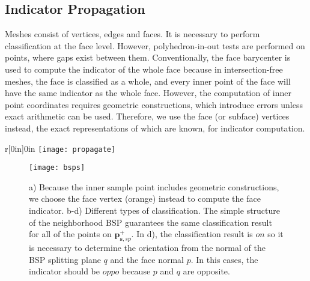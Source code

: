 \subsection{Indicator Propagation}
\label{sec:propagation}



Meshes consist of vertices, edges and faces. It is necessary to perform classification at the face level. However, polyhedron-in-out tests are performed on points, where gaps exist between them. Conventionally, the face barycenter is used to compute the indicator of the whole face because in intersection-free meshes, the face is classified as a whole, and every inner point of the face will have the same indicator as the whole face. However, the computation of inner point coordinates requires geometric constructions, which introduce errors unless exact arithmetic can be used. Therefore, we use the face (or subface) vertices instead, the exact representations of which are known, for indicator computation.

\begin{wrapfigure}{r}[0in]{0in}
\texttt{[image: propagate]}
\end{wrapfigure}




\begin{figure}[t]
\centering
\texttt{[image: bsps]}
\caption{a) Because the inner sample point includes geometric constructions, we choose the face vertex (orange) instead to compute the face indicator. b-d) Different types of classification. The simple structure of the neighborhood BSP guarantees the same classification result for all of the points on $\bm{p}_{\bm{s}, sp}^+$. In d), the classification result is $on$ so it is necessary to determine the orientation from the normal of the BSP splitting plane $q$ and the face normal $p$. In this cases, the indicator should be $oppo$ because $p$ and $q$ are opposite.}
\label{fig:bsps}
\end{figure}


